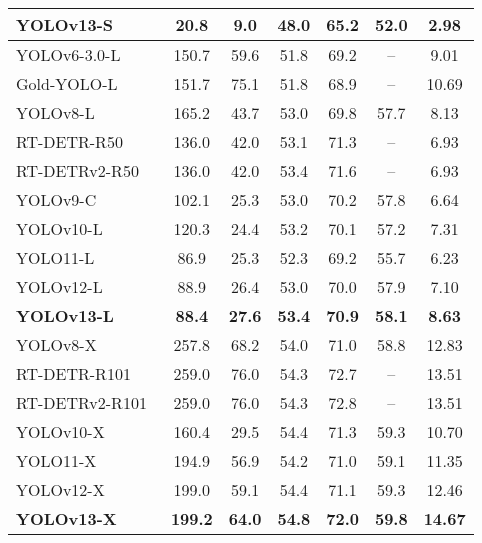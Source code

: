 \begin{table*}[t]
\begin{tabular}{lcccccc}
\textbf{YOLOv13-S}& \textbf{20.8}  & \textbf{9.0}  & \textbf{48.0} & \textbf{65.2} & \textbf{52.0} & \textbf{2.98}\\ \midrule
YOLOv6-3.0-L~\cite{yolov6}        & 150.7 & 59.6 & 51.8  & 69.2  & –    & 9.01\\
Gold-YOLO-L~\cite{goldyolo}         & 151.7 & 75.1 & 51.8  & 68.9  & –    & 10.69\\
YOLOv8-L~\cite{yolov8}            & 165.2 & 43.7 & 53.0  & 69.8  & 57.7 & 8.13\\
RT-DETR-R50~\cite{rt_detr}         & 136.0 & 42.0 & 53.1  & 71.3  & –    & 6.93\\
RT-DETRv2-R50~\cite{rt_detrv2}       & 136.0 & 42.0 & 53.4  & 71.6  & –    & 6.93\\
YOLOv9-C~\cite{yolov9}            & 102.1 & 25.3 & 53.0  & 70.2  & 57.8 & 6.64\\
YOLOv10-L~\cite{yolov10}           & 120.3& 24.4& 53.2& 70.1& 57.2& 7.31\\
YOLO11-L~\cite{yolo11}            & 86.9  & 25.3 & 52.3& 69.2& 55.7 & 6.23\\
YOLOv12-L~\cite{yolov12}           & 88.9  & 26.4 & 53.0  & 70.0  & 57.9 & 7.10\\ \rowcolor{blue!10}
\textbf{YOLOv13-L}& \textbf{88.4}  & \textbf{27.6} & \textbf{53.4}  & \textbf{70.9}  & \textbf{58.1} & \textbf{8.63}\\ \midrule
YOLOv8-X~\cite{yolov8}            & 257.8 & 68.2 & 54.0  & 71.0  & 58.8 & 12.83\\
RT-DETR-R101~\cite{rt_detr}        & 259.0 & 76.0 & 54.3  & 72.7  & –    & 13.51\\
RT-DETRv2-R101~\cite{rt_detrv2}      & 259.0 & 76.0 & 54.3  & 72.8  & –    & 13.51\\
YOLOv10-X~\cite{yolov10}           & 160.4     & 29.5    & 54.4& 71.3& 59.3& 10.70\\
YOLO11-X~\cite{yolo11}            & 194.9& 56.9& 54.2& 71.0& 59.1& 11.35\\
YOLOv12-X~\cite{yolov12}           & 199.0     & 59.1    & 54.4    & 71.1& 59.3& 12.46\\ \rowcolor{blue!10}
\textbf{YOLOv13-X}& \textbf{199.2} & \textbf{64.0} & \textbf{54.8}  & \textbf{72.0}  & \textbf{59.8} & \textbf{14.67}\\
\bottomrule
\end{tabular}
\vspace{-0.4cm}
\end{table*}
